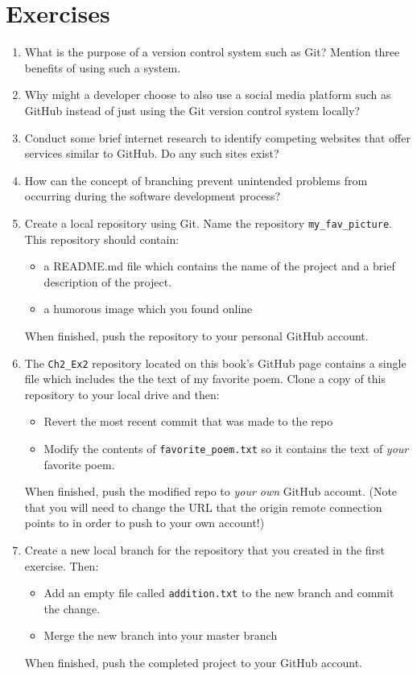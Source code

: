 \documentclass{book}
\begin{document}
\section{Exercises}
\begin{enumerate}
	\item What is the purpose of a version control system such as Git? Mention three benefits of using such a system.
	\item Why might a developer choose to also use a social media platform such as GitHub instead of just using the Git version control system locally?
	\item Conduct some brief internet research to identify competing websites that offer services similar to GitHub. Do any such sites exist?
	\item How can the concept of branching prevent unintended problems from occurring during the software development process?
	\item Create a local repository using Git. Name the repository \texttt{my\_fav\_picture}. This repository should contain:
	\begin{itemize}
		\item a README.md file which contains the name of the project and a brief description of the project. 
		\item a humorous image which you found online 
	\end{itemize}
		When finished, push the repository to your personal GitHub account.
	\item The \texttt{Ch2\_Ex2} repository located on this book's GitHub page contains a single file which includes the the text of my favorite poem. Clone a copy of this repository to your local drive and then:
	\begin{itemize}
		\item Revert the most recent commit that was made to the repo
		\item Modify the contents of \texttt{favorite\_poem.txt} so it contains the text of \textit{your} favorite poem.
	\end{itemize}
	When finished, push the modified repo to \textit {your own} GitHub account. (Note that you will need to change the URL that the origin remote connection points to in order to push to your own account!)
	\item Create a new local branch for the repository that you created in the first exercise. Then:
	\begin {itemize}
		\item Add an empty file called \texttt{addition.txt} to the new branch and commit the change.
		\item Merge the new branch into your master branch
	\end {itemize}
	When finished, push the completed project to your GitHub account.
\end{enumerate}
\end{document}
